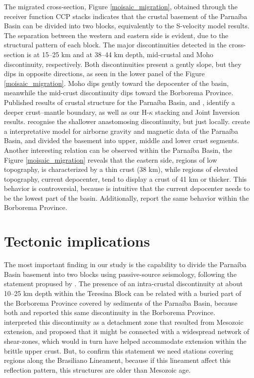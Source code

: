 \documentclass[paper,11pt]{geophysics}
\begin{document}
The migrated cross-section, Figure \ref{moisaic_migration}, obtained through the receiver function CCP stacks indicates that the crustal basement of the Parnaíba Basin can be divided into two blocks, equivalently to the S-velocity model results. The separation between the western and eastern side is evident, due to the structural pattern of each block. The major discontinuities detected in the cross-section is at 15–25 km and at 38–44 km depth, mid-crustal and Moho discontinuity, respectively. Both discontinuities present a gently slope, but they dips in opposite directions, as seen in the lower panel of the Figure \ref{moisaic_migration}. Moho dips gently toward the depocenter of the basin, meanwhile the mid-crust discontinuity dips toward the Borborema Province. Published results of crustal structure for the Parnaíba Basin, \cite{de_castro_crustal_2014} and \cite{daly_brasiliano_2014}, identify a deeper crust–mantle boundary, as well as our H-$\kappa$ stacking and Joint Inversion results. \cite{daly_brasiliano_2014} recognise the shallower anastomosing discontinuity, but just locally. \cite{de_castro_crustal_2014} create a interpretative model for airborne gravity and magnetic data of the Parnaíba Basin, and divided the basement into upper, middle and lower crust segments. Another interesting relation can be observed within the Parnaíba Basin, the Figure \ref{moisaic_migration} reveals that the eastern side, regions of low topography, is characterized by a thin crust (38 km), while regions of elevated topography, current depocenter, tend to display a crust of 41 km or thicker. This behavior is controversial, because is intuitive that the current depocenter needs to be the lowest part of the basin. Additionally, \cite{almeida_crustal_2015} report the same behavior within the Borborema Province.

\section{Tectonic implications}

The most important finding in our study is the capability to divide the Parnaíba Basin basement into two blocks using passive-source seismology, following the statement propused by \cite{de_castro_crustal_2014}. The presence of an intra-crustal discontinuity at about 10–25 km depth within the Teresina Block can be related with a buried part of the Borborema Province covered by sediments of the Parnaíba Basin, because both \cite{pavao_upper_lower_2013} and \cite{almeida_crustal_2015} reported this same discontinuity in the Borborema Province. \cite{almeida_crustal_2015} interpreted this discontinuity as a detachment zone that resulted from Mesozoic extension, and proposed that it might be connected with a widespread network of shear-zones, which would in turn have helped accommodate extension within the brittle upper crust. But, to confirm this statement we need stations covering regions along the Brasiliano Lineament, because if this lineament affect this reflection pattern, this structures are older than Mesozoic age. 
\end{document}
